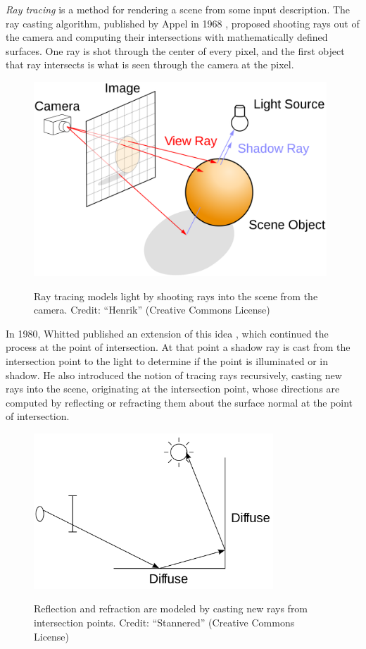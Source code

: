 \documentclass[12pt]{ucthesis}
\newcommand{\captionfonts}{\small\bf\ssp}
\begin{document}
\emph{Ray tracing} is a method for rendering a scene from some input description.
The ray casting algorithm, published by Appel in 1968 \cite{appel:1968}, proposed
shooting rays out of the camera and computing their intersections with mathematically
defined surfaces. One ray is shot through the center of every pixel, and the first
object that ray intersects is what is seen through the camera at the pixel.

\begin{figure}[h!]
    \centering
    \includegraphics[width=110mm]{figures/raytracing.png}
    \captionfonts
    \caption{Ray tracing models light by shooting rays into the scene from the camera. Credit: ``Henrik'' (Creative Commons License)}
    \label{fig:raytracing}
\end{figure}

In 1980, Whitted published an extension of this idea \cite{whitted:1980},
which continued the process at the point of intersection. At that point a shadow
ray is cast from the intersection point to the light to determine if the
point is illuminated or in shadow. He also introduced the notion of tracing
rays recursively, casting new rays into the scene, originating at the intersection
point, whose directions are computed by reflecting or refracting them about the
surface normal at the point of intersection.

\begin{figure}[h!]
    \centering
    \includegraphics[width=90mm]{figures/reflectionrefraction.png}
    \captionfonts
    \caption{Reflection and refraction are modeled by casting new rays from intersection points. Credit: ``Stannered'' (Creative Commons License)}
    \label{fig:reflectrefract}
\end{figure}
\end{document}
